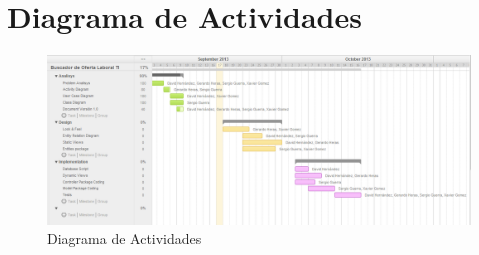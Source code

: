 \section{Diagrama de Actividades}

\begin{figure}[h]
\begin{center}
	\includegraphics[scale=0.55]{./resources/ActDiagram.png}
	\caption{Diagrama de Actividades}
	\label{fig:actdiagram}
\end{center}
\end{figure}